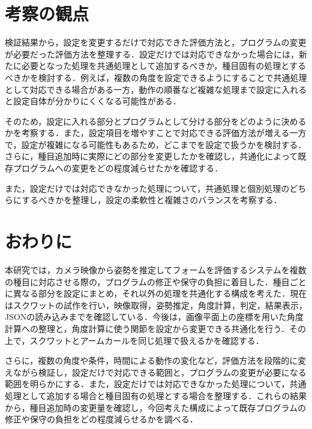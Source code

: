 \documentclass[no-page-number]{nanzan-abstract}
\begin{document}
\section{考察の観点}

検証結果から，設定を変更するだけで対応できた評価方法と，プログラムの変更が必要だった評価方法を整理する．設定だけでは対応できなかった場合には，新たに必要となった処理を共通処理として追加するべきか，種目固有の処理とするべきかを検討する．例えば，複数の角度を設定できるようにすることで共通処理として対応できる場合がある一方，動作の順番など複雑な処理まで設定に入れると設定自体が分かりにくくなる可能性がある．

そのため，設定に入れる部分とプログラムとして分ける部分をどのように決めるかを考察する．また，設定項目を増やすことで対応できる評価方法が増える一方で，設定が複雑になる可能性もあるため，どこまでを設定で扱うかを検討する．さらに，種目追加時に実際にどの部分を変更したかを確認し，共通化によって既存プログラムへの変更をどの程度減らせたかを確認する．

また，設定だけでは対応できなかった処理について，共通処理と個別処理のどちらにするべきかを整理し，設定の柔軟性と複雑さのバランスを考察する．

\section{おわりに}

本研究では，カメラ映像から姿勢を推定してフォームを評価するシステムを複数の種目に対応させる際の，プログラムの修正や保守の負担に着目した．種目ごとに異なる部分を設定にまとめ，それ以外の処理を共通化する構成を考えた．現在はスクワットの試作を行い，映像取得，姿勢推定，角度計算，判定，結果表示，JSONの読み込みまでを確認している．今後は，画像平面上の座標を用いた角度計算への整理と，角度計算に使う関節を設定から変更できる共通化を行う．その上で，スクワットとアームカールを同じ処理で扱えるかを確認する．

さらに，複数の角度や条件，時間による動作の変化など，評価方法を段階的に変えながら検証し，設定だけで対応できる範囲と，プログラムの変更が必要になる範囲を明らかにする．また，設定だけでは対応できなかった処理について，共通処理として追加する場合と種目固有の処理とする場合を整理する．これらの結果から，種目追加時の変更量を確認し，今回考えた構成によって既存プログラムの修正や保守の負担をどの程度減らせるかを調べる．
\end{document}
